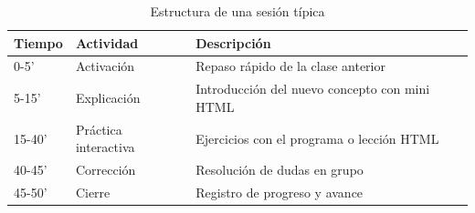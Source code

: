 \documentclass[12pt,spanish]{article}
\begin{document}
\begin{table}[H]
\centering
\caption{Estructura de una sesión típica}
\label{tab:leccion}
\begin{tabular}{|p{2.5cm}|p{4cm}|p{5cm}|}
\hline
\textbf{Tiempo} & \textbf{Actividad} & \textbf{Descripción} \\
\hline
0-5' & Activación & Repaso rápido de la clase anterior \\
\hline
5-15' & Explicación & Introducción del nuevo concepto con mini HTML \\
\hline
15-40' & Práctica interactiva & Ejercicios con el programa o lección HTML \\
\hline
40-45' & Corrección & Resolución de dudas en grupo \\
\hline
45-50' & Cierre & Registro de progreso y avance \\
\hline
\end{tabular}
\end{table}
\end{document}

